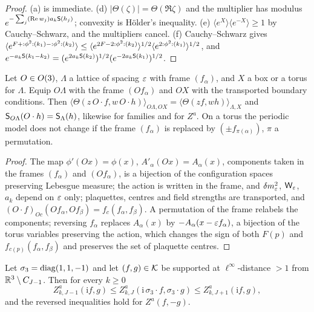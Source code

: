 \begin{proof}
(a) is immediate. (d) $|\Theta(\zeta)|=\Theta(\Re\zeta)$ and the multiplier has modulus $e^{-\sum_j(\operatorname{Re} w_j)a_k\mathsf S(h_j)}$; convexity is H\"older's inequality. (e) $\langle e^{X}\rangle\langle e^{-X}\rangle\ge1$ by Cauchy--Schwarz, and the multipliers cancel. (f) Cauchy--Schwarz gives $\langle e^{F+{:}\phi^2{:}(k_1)-{:}\phi^2{:}(k_2)}\rangle\le\langle e^{2F-2{:}\phi^2{:}(k_2)}\rangle^{1/2}\langle e^{2{:}\phi^2{:}(k_1)}\rangle^{1/2}$, and $e^{-a_k\mathsf S(k_1-k_2)}=(e^{2a_k\mathsf S(k_2)})^{1/2}(e^{-2a_k\mathsf S(k_1)})^{1/2}$.
\end{proof}

\begin{lemma}\label{lem:s02:pass}
Let $O\in O(3)$, $\Lambda$ a lattice of spacing $\varepsilon$ with frame $(f_\alpha)$, and $X$ a box or a torus for $\Lambda$. Equip $O\Lambda$ with the frame $(Of_\alpha)$ and $OX$ with the transported boundary conditions. Then $\langle\Theta(z\,O\cdot f,w\,O\cdot h)\rangle_{O\Lambda,OX}=\langle\Theta(zf,wh)\rangle_{\Lambda,X}$ and $\mathsf S_{O\Lambda}(O\cdot h)=\mathsf S_\Lambda(h)$, likewise for families and for $Z^a$. On a torus the periodic model does not change if the frame $(f_\alpha)$ is replaced by $(\pm f_{\pi(\alpha)})$, $\pi$ a permutation.
\end{lemma}

\begin{proof}
The map $\phi'(Ox)=\phi(x)$, $A'_\alpha(Ox)=A_\alpha(x)$, components taken in the frames $(f_\alpha)$ and $(Of_\alpha)$, is a bijection of the configuration spaces preserving Lebesgue measure; the action is written in the frame, and $\delta m^2_{\varepsilon}$, $\mathsf W_{\varepsilon}$, $a_k$ depend on $\varepsilon$ only; plaquettes, centres and field strengths are transported, and $(O\cdot f)_{Oc}(Of_\alpha,Of_\beta)=f_c(f_\alpha,f_\beta)$. A permutation of the frame relabels the components; reversing $f_\alpha$ replaces $A_\alpha(x)$ by $-A_\alpha(x-\varepsilon f_\alpha)$, a bijection of the torus variables preserving the action, which changes the sign of both $F(p)$ and $f_{c(p)}(f_\alpha,f_\beta)$ and preserves the set of plaquette centres.
\end{proof}

\begin{lemma}\label{lem:s02:refl}
Let $\sigma_3=\operatorname{diag}(1,1,-1)$ and let $(f,g)\in\mathcal K$ be supported at $\ell^\infty$-distance $>1$ from $\mathbb R^3\setminus C_{J-1}$. Then for every $k\ge0$
\[
Z^a_{k,J-1}(\mathrm if,g)\le Z^a_{k,J}(\mathrm i\,\sigma_3\!\cdot\!f,\sigma_3\!\cdot\!g)\le Z^a_{k,J+1}(\mathrm if,g),
\]
and the reversed inequalities hold for $Z^a(f,-g)$.
\end{lemma}

